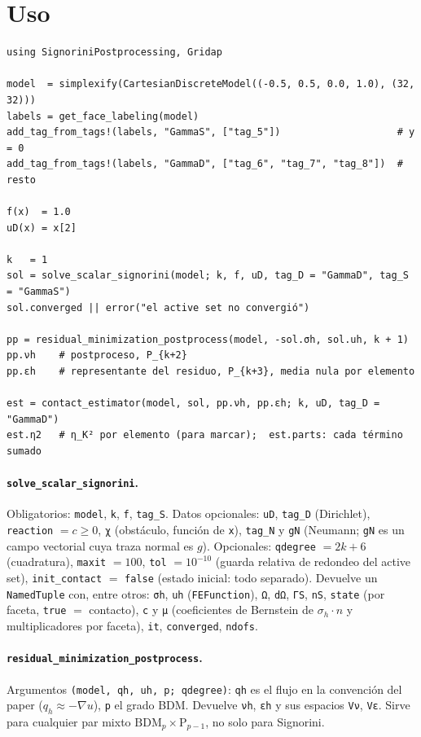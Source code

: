 \documentclass[11pt,a4paper]{article}
\newcommand{\code}[1]{\texttt{#1}}
\newcommand{\BDM}{\mathrm{BDM}}
\newcommand{\Pk}[1]{\mathrm{P}_{#1}}
\begin{document}
\section{Uso}

\begin{Verbatim}
using SignoriniPostprocessing, Gridap

model  = simplexify(CartesianDiscreteModel((-0.5, 0.5, 0.0, 1.0), (32, 32)))
labels = get_face_labeling(model)
add_tag_from_tags!(labels, "GammaS", ["tag_5"])                    # y = 0
add_tag_from_tags!(labels, "GammaD", ["tag_6", "tag_7", "tag_8"])  # resto

f(x)  = 1.0
uD(x) = x[2]

k   = 1
sol = solve_scalar_signorini(model; k, f, uD, tag_D = "GammaD", tag_S = "GammaS")
sol.converged || error("el active set no convergió")

pp = residual_minimization_postprocess(model, -sol.σh, sol.uh, k + 1)
pp.νh    # postproceso, P_{k+2}
pp.εh    # representante del residuo, P_{k+3}, media nula por elemento

est = contact_estimator(model, sol, pp.νh, pp.εh; k, uD, tag_D = "GammaD")
est.η2   # η_K² por elemento (para marcar);  est.parts: cada término sumado
\end{Verbatim}

\paragraph{\code{solve\_scalar\_signorini}.}
Obligatorios: \code{model}, \code{k}, \code{f}, \code{tag\_S}.
Datos opcionales: \code{uD}, \code{tag\_D} (Dirichlet), \code{reaction} $=c\ge0$,
\code{χ} (obstáculo, función de \code{x}), \code{tag\_N} y \code{gN} (Neumann; \code{gN} es un
campo vectorial cuya traza normal es $g$).
Opcionales: \code{qdegree} $=2k+6$ (cuadratura), \code{maxit} $=100$,
\code{tol} $=10^{-10}$ (guarda relativa de redondeo del active set),
\code{init\_contact} $=$ \code{false} (estado inicial: todo separado).
Devuelve un \code{NamedTuple} con, entre otros:
\code{σh}, \code{uh} (\code{FEFunction}), \code{Ω}, \code{dΩ}, \code{ΓS}, \code{nS},
\code{state} (por faceta, \code{true} $=$ contacto), \code{c} y \code{μ} (coeficientes de
Bernstein de $\sigma_h\cdot n$ y multiplicadores por faceta), \code{it}, \code{converged},
\code{ndofs}.

\paragraph{\code{residual\_minimization\_postprocess}.}
Argumentos \code{(model, qh, uh, p; qdegree)}: \code{qh} es el flujo en la convención del paper ($q_h\approx-\nabla u$), \code{p} el grado BDM.
Devuelve \code{νh}, \code{εh} y sus espacios \code{Vν}, \code{Vε}. Sirve para cualquier par mixto
$\BDM_p\times\Pk{p-1}$, no solo para Signorini.
\end{document}
